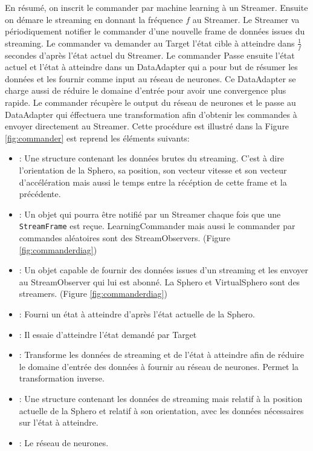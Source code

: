 En résumé, on inscrit le commander par machine learning à un Streamer.
Ensuite on démare le streaming en donnant la fréquence $f$ au Streamer.
Le Streamer va périodiquement notifier le commander d'une nouvelle frame de données issues du streaming.
Le commander va demander au Target l'état cible à atteindre dans $\frac{1}{f}$ secondes d'après l'état actuel du Streamer.
Le commander Passe ensuite l'état actuel et l'état à atteindre dans un DataAdapter qui a pour but de résumer les données et les fournir comme input au réseau de neurones.
Ce DataAdapter se charge aussi de réduire le domaine d'entrée pour avoir une convergence plus rapide.
Le commander récupère le output du réseau de neurones et le passe au DataAdapter qui éffectuera une transformation afin d'obtenir les commandes à envoyer directement au Streamer.
Cette procédure est illustré dans la Figure \ref{fig:commander} est reprend les éléments suivants:
\begin{itemize}
 \item {}: Une structure contenant les données brutes du streaming.
  C'est à dire l'orientation de la Sphero, sa position, son vecteur vitesse et son vecteur d'accélération mais aussi le temps entre la récéption de cette frame et la précédente.
 \item {}: Un objet qui pourra être notifié par un Streamer chaque fois que une \texttt{StreamFrame} est reçue.
  LearningCommander mais aussi le commander par commandes aléatoires sont des StreamObservers. (Figure \ref{fig:commanderdiag})
 \item {}: Un objet capable de fournir des données issues d'un streaming et les envoyer au StreamObserver qui lui est abonné.
  La Sphero et VirtualSphero sont des streamers. (Figure \ref{fig:commanderdiag})
 \item {}: Fourni un état à atteindre d'après l'état actuelle de la Sphero.
 \item {}: Il essaie d'atteindre l'état demandé par Target
 \item {}: Transforme les données de streaming et de l'état à atteindre afin de réduire le domaine d'entrée des données à fournir au réseau de neurones.
  Permet la transformation inverse.
 \item {}: Une structure contenant les données de streaming mais relatif à la position actuelle de la Sphero et relatif à son orientation,
  avec les données nécessaires sur l'état à atteindre.
 \item {}: Le réseau de neurones.
\end{itemize}

